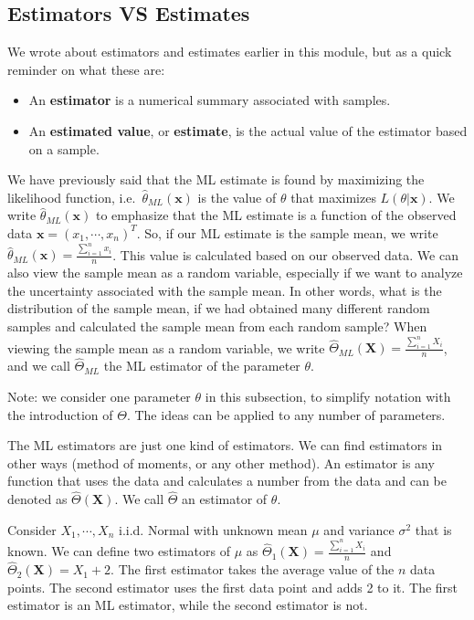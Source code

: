 \documentclass[
]{book}
\begin{document}
\hypertarget{estimators-vs-estimates}{%
\subsection{Estimators VS Estimates}\label{estimators-vs-estimates}}

We wrote about estimators and estimates earlier in this module, but as a quick reminder on what these are:

\begin{itemize}
\item
  An \textbf{estimator} is a numerical summary associated with samples.
\item
  An \textbf{estimated value}, or \textbf{estimate}, is the actual value of the estimator based on a sample.
\end{itemize}

We have previously said that the ML estimate is found by maximizing the likelihood function, i.e.~\(\hat{\theta}_{ML}(\boldsymbol{x})\) is the value of \(\theta\) that maximizes \(L(\theta| \boldsymbol{x})\). We write \(\hat{\theta}_{ML}(\boldsymbol{x})\) to emphasize that the ML estimate is a function of the observed data \(\boldsymbol{x} = (x_1,\cdots, x_n)^T\). So, if our ML estimate is the sample mean, we write \(\hat{\theta}_{ML}(\boldsymbol{x}) = \frac{\sum_{i=1}^n x_i}{n}\). This value is calculated based on our observed data.
We can also view the sample mean as a random variable, especially if we want to analyze the uncertainty associated with the sample mean. In other words, what is the distribution of the sample mean, if we had obtained many different random samples and calculated the sample mean from each random sample? When viewing the sample mean as a random variable, we write \(\hat{\Theta}_{ML}(\boldsymbol{X}) = \frac{\sum_{i=1}^n X_i}{n}\), and we call \(\hat{\Theta}_{ML}\) the ML estimator of the parameter \(\theta\).

Note: we consider one parameter \(\theta\) in this subsection, to simplify notation with the introduction of \(\Theta\). The ideas can be applied to any number of parameters.

The ML estimators are just one kind of estimators. We can find estimators in other ways (method of moments, or any other method). An estimator is any function that uses the data and calculates a number from the data and can be denoted as \(\hat{\Theta}(\boldsymbol{X})\). We call \(\hat{\Theta}\) an estimator of \(\theta\).

Consider \(X_1, \cdots, X_n\) i.i.d. Normal with unknown mean \(\mu\) and variance \(\sigma^2\) that is known. We can define two estimators of \(\mu\) as \(\hat{\Theta}_1(\boldsymbol{X}) = \frac{\sum_{i=1}^n X_i}{n}\) and \(\hat{\Theta}_2(\boldsymbol{X}) = X_1 + 2\). The first estimator takes the average value of the \(n\) data points. The second estimator uses the first data point and adds 2 to it. The first estimator is an ML estimator, while the second estimator is not.
\end{document}
